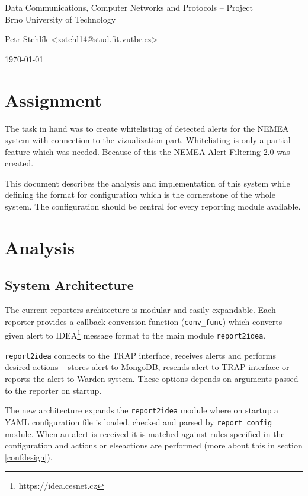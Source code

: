 \documentclass[11pt,a4paper]{article}
\begin{document}
\begin{center}
	\LARGE{Data Communications, Computer Networks and Protocols -- Project}\\
	\large{Brno University of Technology}
	\vspace{0.5cm}

	Petr Stehlík <xstehl14@stud.fit.vutbr.cz>

	\vspace{0.2cm}

	\today

\end{center}

\section{Assignment}
The task in hand was to create whitelisting of detected alerts for the NEMEA system with connection to the vizualization part. Whitelisting is only a partial feature which was needed. Because of this the NEMEA Alert Filtering 2.0 was created.

This document describes the analysis and implementation of this system while defining the format for configuration which is the cornerstone of the whole system. The configuration should be central for every reporting module available.

\section{Analysis}
\subsection{System Architecture}

The current reporters architecture is modular and easily expandable. Each reporter provides a callback conversion function (\texttt{conv\_func}) which converts given alert to IDEA\footnote{https://idea.cesnet.cz} message format to the main module \texttt{report2idea}.

\texttt{report2idea} connects to the TRAP interface, receives alerts and performs desired actions -- stores alert to MongoDB, resends alert to TRAP interface or reports the alert to Warden system. These options depends on arguments passed to the reporter on startup.

The new architecture expands the \texttt{report2idea} module where on startup a YAML configuration file is loaded, checked and parsed by \texttt{report\_config} module. When an alert is received it is matched against rules specified in the configuration and actions or elseactions are performed (more about this in section \ref{confdesign}).
\end{document}
